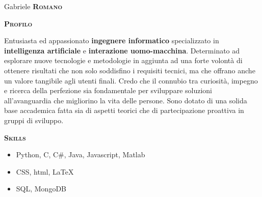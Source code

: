 \documentclass[11pt, a4paper]{article}
\newcommand{\headleft}[1]{\vspace*{2.7ex}\textsc{\textbf{#1}}\par%
    \vspace*{-1.5ex}\hrulefill\par\vspace*{0.7ex}}
\begin{document}
\setlength{\topskip}{0.1pt}
\setlength{\parindent}{0pt}
\setlength{\parskip}{0pt}
\setlength{\fboxsep}{0pt}
\pagestyle{empty}
\raggedbottom

\begin{minipage}[t]{0.34\textwidth} %
\colorbox{cvblue}{\begin{minipage}[t][5mm][t]{\textwidth}\null\hfill\null\end{minipage}}

\vspace{-.2ex} %
\colorbox{cvblue!90}{\color{white}  %
\textwidth\relax%
\begin{minipage}[t][293mm][t]{0.82\textwidth}
\raggedright
\vspace*{2ex}

\centering \Large Gabriele \textbf{\textsc{Romano}} \normalsize 

\vspace*{2ex}

\headleft{Profilo}
Entusiasta ed appassionato \textbf{ingegnere informatico} specializzato in \textbf{intelligenza artificiale} e \textbf{interazione uomo-macchina}. %
Determinato ad esplorare nuove tecnologie e metodologie in aggiunta ad una forte volontà di ottenere risultati che non solo soddisfino i requisiti tecnici, ma che offrano anche un valore tangibile agli utenti finali. %
Credo che il connubio tra curiosità, impegno e ricerca della perfezione sia fondamentale per sviluppare soluzioni all'avanguardia che migliorino la vita delle persone. %
Sono dotato di una solida base accademica fatta sia di aspetti teorici che di partecipazione proattiva in gruppi di sviluppo. %

\headleft{Skills}
\begin{itemize}
    \item Python, C, C\#, Java, Javascript, Matlab
    \item CSS, html, \LaTeX
    \item SQL, MongoDB
\end{itemize} 


\end{minipage}}
\end{minipage}
\end{document}
